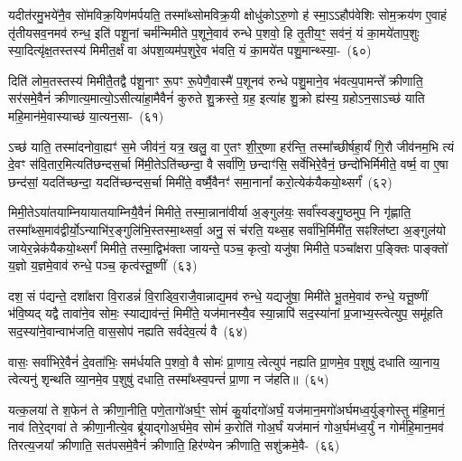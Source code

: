 यदीत॑रमु॒भये॑नै॒व सो॑मविक्र॒यिण॑मर्पयति॒ तस्मा᳚थ्सोम\-विक्र॒यी क्षोधु॑को\-ऽरु॒णो ह॑ स्मा॒ऽऽहौप॑वेशिः सोम॒\-क्रय॑ण ए॒वाहं तृ॑तीय\-सव॒नमव॑ रुन्ध॒ इति॑ पशू॒नां चर्म॑न्मिमीते प॒शूने॒वाव॑ रुन्धे प॒शवो॒ हि तृ॒तीय॒ꣳ॒ सव॑नं॒ यं का॒मये॑ताप॒शुः स्या॒दित्यृ॑क्ष॒तस्तस्य॑ मिमीत॒र्क्षं वा अ॑पश॒व्यम॑प॒शुरे॒व भ॑वति॒ यं का॒मये॑त पशु॒मान्थ्स्या॒-~(६०)\ip

दिति॑ लोम॒तस्तस्य॑ मिमीतै॒तद्वै प॑शू॒नाꣳ रू॒पꣳ रू॒पेणै॒वास्मै॑ प॒शूनव॑ रुन्धे पशु॒माने॒व भ॑वत्य॒पामन्ते᳚ क्रीणाति॒ सर॑समे॒वैनं॑ क्रीणात्य॒मात्यो॒\-ऽसीत्या॑हा॒मैवैनं॑ कुरुते शु॒क्रस्ते॒ ग्रह॒ इत्या॑ह शु॒क्रो ह्य॑स्य॒ ग्रहो\-ऽन॒सा\-ऽच्छ॑ याति महि॒मान॑मे॒वास्याच्छ॑ या॒त्यन॒सा-~(६१)\ip

ऽच्छ॑ याति॒ तस्मा॑दनोवा॒ह्यꣳ॑ स॒मे जीव॑नं॒ यत्र॒ खलु॒ वा ए॒तꣳ शी॒र्॒\mbox{}ष्णा हर॑न्ति॒ तस्मा᳚च्छीर्\mbox{}षहा॒र्यं॑ गि॒रौ जीव॑नम॒भि त्यं दे॒वꣳ स॑वि॒तार॒मित्यति॑छन्दस॒र्चा मि॑मी॒ते\-ऽति॑च्छन्दा॒ वै सर्वा॑णि॒ छन्दाꣳ॑सि॒ सर्वे॑भिरे॒वैनं॒ छन्दो॑भिर्मिमीते॒ वर्\mbox{}ष्म॒ वा ए॒षा छन्द॑सां॒ यदति॑च्छन्दा॒ यदति॑च्छन्दस॒र्चा मिमी॑ते॒ वर्\mbox{}ष्मै॒वैनꣳ॑ समा॒नानां᳚ करो॒त्येक॑यैकयो॒थ्सर्गं॑~(६२)\ip

मिमी॒ते\-ऽया॑तयाम्नियायातयाम्नियै॒वैनं॑ मिमीते॒ तस्मा॒न्नाना॑वीर्या अ॒ङ्गुल॑यः॒ सर्वा᳚स्वङ्गु॒ष्ठमुप॒ नि गृ॑ह्णाति॒ तस्मा᳚थ्स॒माव॑द्वीर्यो॒\-ऽन्याभि॑र॒ङ्गुलि॑भि॒स्तस्मा॒थ्सर्वा॒ अनु॒ सं च॑रति॒ यथ्स॒ह सर्वा॑भि॒र्मिमी॑त॒ सꣴश्लि॑ष्टा अ॒ङ्गुल॑यो जायेर॒न्नेक॑यैकयो॒थ्सर्गं॑ मिमीते॒ तस्मा॒द्विभ॑क्ता जायन्ते॒ पञ्च॒ कृत्वो॒ यजु॑षा मिमीते॒ पञ्चा᳚क्षरा प॒ङ्क्तिः पाङ्क्तो॑ य॒ज्ञो य॒ज्ञमे॒वाव॑ रुन्धे॒ पञ्च॒ कृत्व॑स्तू॒ष्णीं~(६३)\ip

दश॒ सं प॑द्यन्ते॒ दशा᳚क्षरा वि॒राडन्नं॑ वि॒राड्वि॒राजै॒वान्नाद्य॒मव॑ रुन्धे॒ यद्यजु॑षा॒ मिमी॑ते भू॒तमे॒वाव॑ रुन्धे॒ यत्तू॒ष्णीं भ॑वि॒ष्यद् यद्वै तावा॑ने॒व सोमः॒ स्याद्याव॑न्तं॒ मिमी॑ते॒ यज॑मानस्यै॒व स्या॒न्नापि॑ सद॒स्या॑नां प्र॒जाभ्य॒स्त्वेत्युप॒ समू॑हति सद॒स्या॑ने॒वान्वाभ॑जति॒ वास॒सोप॑ नह्यति सर्वदेव॒त्यं॑ वै~(६४)\ip

वासः॒ सर्वा॑भिरे॒वैनं॑ दे॒वता॑भिः॒ सम॑र्धयति प॒शवो॒ वै सोमः॑ प्रा॒णाय॒ त्वेत्युप॑ नह्यति प्रा॒णमे॒व प॒शुषु॑ दधाति व्या॒नाय॒ त्वेत्यनु॑ शृन्थति व्या॒नमे॒व प॒शुषु॑ दधाति॒ तस्मा᳚थ्स्व॒पन्तं॑ प्रा॒णा न ज॑हति॥~(६५)\ip

{\anuvakamend[{इत॑रं पशु॒मान्थ्स्या᳚द्या॒त्यन॑सो॒थ्सर्ग॑न्तू॒ष्णीꣳ स॑र्वदेव॒त्यं॑ वै त्रय॑स्त्रिꣳशच्च}]}

यत्क॒लया॑ ते श॒फेन॑ ते क्रीणा॒नीति॒ पणे॒तागो॑अर्घ॒ꣳ॒ सोमं॑ कु॒र्यादगो॑अर्घं॒ यज॑मान॒मगो॑अर्घमध्व॒र्युङ्गोस्तु म॑हि॒मानं॒ नाव॑ तिरे॒द्गवा॑ ते क्रीणा॒नीत्ये॒व ब्रू॑याद्गोअ॒र्घमे॒व सोमं॑ क॒रोति॑ गोअ॒र्घं यज॑मानं गोअ॒र्घम॑ध्व॒र्युं न गोर्म॑हि॒मान॒मव॑ तिरत्य॒जया᳚ क्रीणाति॒ सत॑पसमे॒वैनं॑ क्रीणाति॒ हिर॑ण्येन क्रीणाति॒ सशु॑क्रमे॒वै-~(६६)\ip

